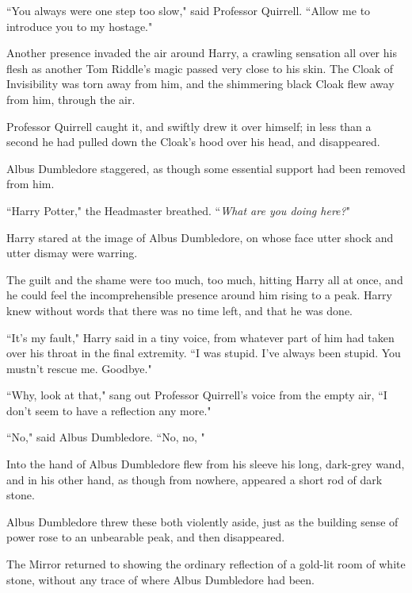 ``You always were one step too slow," said Professor Quirrell. ``Allow me to introduce you to my hostage."

Another presence invaded the air around Harry, a crawling sensation all over his flesh as another Tom Riddle's magic passed very close to his skin. The Cloak of Invisibility was torn away from him, and the shimmering black Cloak flew away from him, through the air.

Professor Quirrell caught it, and swiftly drew it over himself; in less than a second he had pulled down the Cloak's hood over his head, and disappeared.

Albus Dumbledore staggered, as though some essential support had been removed from him.

``Harry Potter," the Headmaster breathed. ``\emph{What are you doing here?}"

Harry stared at the image of Albus Dumbledore, on whose face utter shock and utter dismay were warring.

The guilt and the shame were too much, too much, hitting Harry all at once, and he could feel the incomprehensible presence around him rising to a peak. Harry knew without words that there was no time left, and that he was done.

``It's my fault," Harry said in a tiny voice, from whatever part of him had taken over his throat in the final extremity. ``I was stupid. I've always been stupid. You mustn't rescue me. Goodbye."

``Why, look at that," sang out Professor Quirrell's voice from the empty air, ``I don't seem to have a reflection any more."

``No," said Albus Dumbledore. ``No, no, "

Into the hand of Albus Dumbledore flew from his sleeve his long, dark-grey wand, and in his other hand, as though from nowhere, appeared a short rod of dark stone.

Albus Dumbledore threw these both violently aside, just as the building sense of power rose to an unbearable peak, and then disappeared.

The Mirror returned to showing the ordinary reflection of a gold-lit room of white stone, without any trace of where Albus Dumbledore had been.

